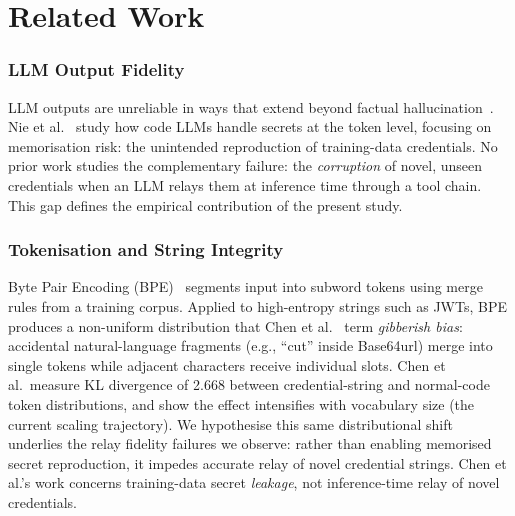 %

\section{Related Work}\label{sec:related_work}

\subsubsection*{LLM Output Fidelity}
LLM outputs are unreliable in ways that extend beyond factual
hallucination~\cite{huang2025hallucination, ji2023hallucination}. Nie et
al.~\cite{nie2025decoding} study how code LLMs handle secrets at the token
level, focusing on memorisation risk: the unintended reproduction of
training-data credentials. No prior work studies the complementary failure: the
\emph{corruption} of novel, unseen credentials when an LLM relays them at
inference time through a tool chain. This gap defines the empirical contribution
of the present study.

\subsubsection*{Tokenisation and String Integrity}
Byte Pair Encoding (BPE)~\cite{sennrich2016bpe} segments input into subword
tokens using merge rules from a training corpus. Applied to high-entropy strings
such as JWTs, BPE produces a non-uniform distribution that Chen et
al.~\cite{chen2026gibberish} term \emph{gibberish bias}: accidental
natural-language fragments (e.g., ``cut'' inside Base64url) merge into single
tokens while adjacent characters receive individual slots. Chen et al.\ measure
KL divergence of 2.668 between credential-string and normal-code token
distributions, and show the effect intensifies with vocabulary size (the current
scaling trajectory). We hypothesise this same distributional shift underlies
the relay fidelity failures we observe: rather than enabling memorised secret
reproduction, it impedes accurate relay of novel credential strings.
Chen et al.'s work concerns training-data secret \emph{leakage}, not
inference-time relay of novel credentials.

